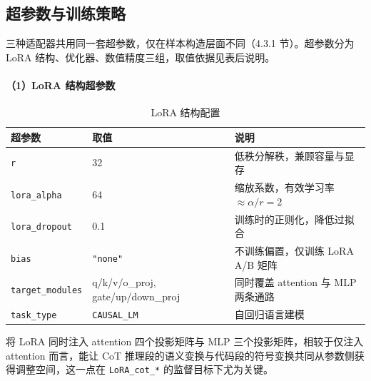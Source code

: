 \subsection{超参数与训练策略}

三种适配器共用同一套超参数，仅在样本构造层面不同（4.3.1 节）。超参数分为 LoRA 结构、优化器、数值精度三组，取值依据见表后说明。

\paragraph{（1）LoRA 结构超参数}
\begin{table}[!htb]
  \centering
  \caption{LoRA 结构配置}
  \label{tab:ch4-lora-struct}
  \footnotesize
  \begin{tabular}{lll}
    \toprule
    超参数 & 取值 & 说明 \\
    \midrule
    \texttt{r}              & 32 & 低秩分解秩，兼顾容量与显存 \\
    \texttt{lora\_alpha}    & 64 & 缩放系数，有效学习率 $\approx \alpha / r = 2$ \\
    \texttt{lora\_dropout}  & 0.1 & 训练时的正则化，降低过拟合 \\
    \texttt{bias}           & \texttt{"none"} & 不训练偏置，仅训练 LoRA A/B 矩阵 \\
    \texttt{target\_modules} & \footnotesize\ttfamily q/k/v/o\_proj, gate/up/down\_proj & 同时覆盖 attention 与 MLP 两条通路 \\
    \texttt{task\_type}     & \texttt{CAUSAL\_LM} & 自回归语言建模 \\
    \bottomrule
  \end{tabular}
\end{table}
将 LoRA 同时注入 attention 四个投影矩阵与 MLP 三个投影矩阵，相较于仅注入 attention 而言，能让 CoT 推理段的语义变换与代码段的符号变换共同从参数侧获得调整空间，这一点在 \texttt{LoRA\_cot\_*} 的监督目标下尤为关键。

